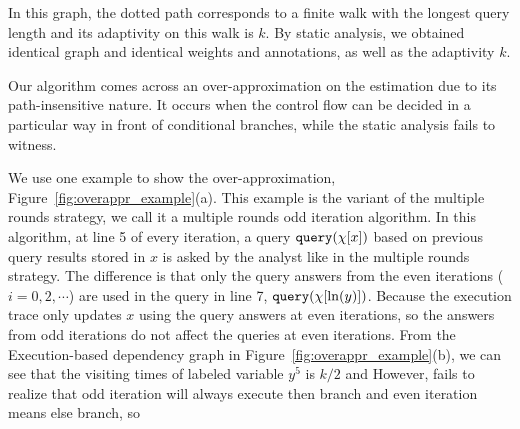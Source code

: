 In this graph, the dotted path corresponds to a finite walk with the longest query length and its adaptivity on this walk is $k$.
%
By static analysis, we obtained identical graph and identical weights and annotations, as well as the adaptivity $k$.
%
\begin{example}
Our algorithm comes across an over-approximation on the estimation due to its path-insensitive nature. It occurs when the control flow can be decided in a particular way in front of conditional branches, while the static analysis fails to witness. 

We use one example to show the over-approximation, Figure~\ref{fig:overappr_example}(a). This example is the variant of the multiple rounds strategy, 
we call it a multiple rounds odd iteration algorithm. In this algorithm, at line 5 of every iteration, 
a query ${\tt query}(\chi[x])$ based on previous query results stored in $x$ is asked by the analyst like in the multiple rounds strategy. The difference is that only the query answers from the even iterations ($i =0, 2, \cdots $) are 
used in the query 
in line 7, ${\tt query}(\chi[\ln(y)])$.
  Because the execution trace only updates 
$x$ using the query answers at even iterations, so the answers from odd iterations do not affect the queries at even iterations. 
From the Execution-based dependency graph in Figure~\ref{fig:overappr_example}(b), 
we can see that the visiting times of labeled variable $y^5$ is 
$k/2$ and 
However, {\THESYSTEM} fails to realize that odd iteration will always execute then branch and even iteration means else branch, so 

\end{example}
